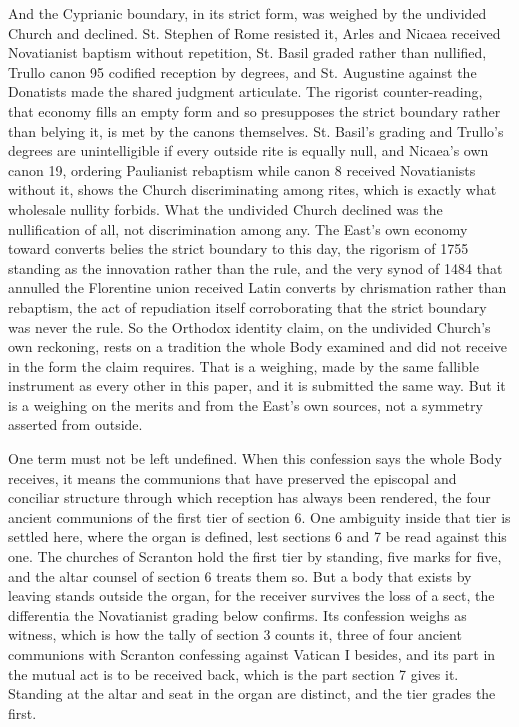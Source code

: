 \documentclass[11pt,twoside]{article}
\newcommand{\unit}[1]{\needspace{3\baselineskip}\par\medskip{\normalfont\bfseries\color{subhead}#1}\par\nobreak\smallskip}
\begin{document}
And the Cyprianic boundary, in its strict form, was weighed by the undivided Church and declined. St. Stephen of Rome resisted it, Arles and Nicaea received Novatianist baptism without repetition, St. Basil graded rather than nullified, Trullo canon 95 codified reception by degrees, and St. Augustine against the Donatists made the shared judgment articulate. The rigorist counter-reading, that economy fills an empty form and so presupposes the strict boundary rather than belying it, is met by the canons themselves. St. Basil's grading and Trullo's degrees are unintelligible if every outside rite is equally null, and Nicaea's own canon 19, ordering Paulianist rebaptism while canon 8 received Novatianists without it, shows the Church discriminating among rites, which is exactly what wholesale nullity forbids. What the undivided Church declined was the nullification of all, not discrimination among any. The East's own economy toward converts belies the strict boundary to this day, the rigorism of 1755 standing as the innovation rather than the rule, and the very synod of 1484 that annulled the Florentine union received Latin converts by chrismation rather than rebaptism, the act of repudiation itself corroborating that the strict boundary was never the rule. So the Orthodox identity claim, on the undivided Church's own reckoning, rests on a tradition the whole Body examined and did not receive in the form the claim requires. That is a weighing, made by the same fallible instrument as every other in this paper, and it is submitted the same way. But it is a weighing on the merits and from the East's own sources, not a symmetry asserted from outside.

\unit{Who counts as the receiver.}
One term must not be left undefined. When this confession says the whole Body receives, it means the communions that have preserved the episcopal and conciliar structure through which reception has always been rendered, the four ancient communions of the first tier of section 6. One ambiguity inside that tier is settled here, where the organ is defined, lest sections 6 and 7 be read against this one. The churches of Scranton hold the first tier by standing, five marks for five, and the altar counsel of section 6 treats them so. But a body that exists by leaving stands outside the organ, for the receiver survives the loss of a sect, the differentia the Novatianist grading below confirms. Its confession weighs as witness, which is how the tally of section 3 counts it, three of four ancient communions with Scranton confessing against Vatican I besides, and its part in the mutual act is to be received back, which is the part section 7 gives it. Standing at the altar and seat in the organ are distinct, and the tier grades the first.
\end{document}
